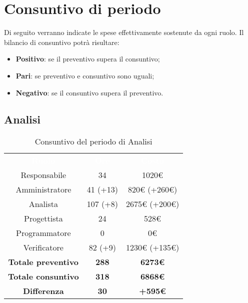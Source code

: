 \section{Consuntivo di periodo}
Di seguito verranno indicate le spese effettivamente sostenute da ogni ruolo. Il bilancio di consuntivo potrà risultare: \begin{itemize}
\item \textbf{Positivo}: se il preventivo supera il consuntivo;
\item \textbf{Pari}: se preventivo e consuntivo sono uguali;
\item \textbf{Negativo}: se il consuntivo supera il preventivo.
\end{itemize}

\subsection{Analisi}
\begin{table}[H]
\centering\renewcommand{\arraystretch}{1.5}
\caption{Consuntivo del periodo di Analisi}
\vspace{0.2cm}
\begin{tabular}{ c | c | c  }
\rowcolor{redafk}
\textcolor{white}{\textbf{Ruolo}} & \textcolor{white}{\textbf{Ore}} & 
\textcolor{white}{\textbf{Costo}}  \\
Responsabile & 34 & 1020€ \\
Amministratore & 41 (+13) & 820€ (+260€) \\
Analista & 107 (+8) & 2675€ (+200€) \\
Progettista	& 24 & 528€  \\
Programmatore & 0 & 0€  \\
Verificatore & 82 (+9) & 1230€ (+135€)  \\
\textbf{Totale preventivo} & \textbf{288} & \textbf{6273€}  \\
\textbf{Totale consuntivo} & \textbf{318} & \textbf{6868€}  \\
\rowcolor{lastrowcolor}
\textbf{Differenza} & \textbf{30} & \textbf{+595€}  \\
\end{tabular}
\end{table}

